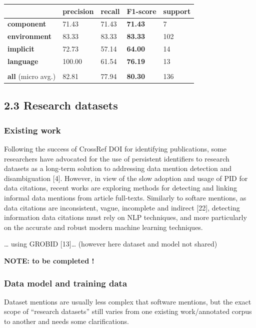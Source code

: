 \documentclass[
]{article}
\begin{document}
\begin{longtable}[]{@{}lllll@{}}
\toprule
& precision & recall & \textbf{F1-score} & support\tabularnewline
\midrule
\endhead
\textbf{component} & 71.43 & 71.43 & \textbf{71.43} & 7\tabularnewline
\textbf{environment} & 83.33 & 83.33 & \textbf{83.33} &
102\tabularnewline
\textbf{implicit} & 72.73 & 57.14 & \textbf{64.00} & 14\tabularnewline
\textbf{language} & 100.00 & 61.54 & \textbf{76.19} & 13\tabularnewline
& & & &\tabularnewline
\textbf{all} (micro avg.) & 82.81 & 77.94 & \textbf{80.30} &
136\tabularnewline
\bottomrule
\end{longtable}

\hypertarget{research-datasets}{%
\subsection{2.3 Research datasets}\label{research-datasets}}

\hypertarget{existing-work}{%
\subsubsection{Existing work}\label{existing-work}}

Following the success of CrossRef DOI for identifying publications, some
researchers have advocated for the use of persistent identifiers to
research datasets as a long-term solution to addressing data mention
detection and disambiguation {[}4{]}. However, in view of the slow
adoption and usage of PID for data citations, recent works are exploring
methods for detecting and linking informal data mentions from article
full-texts. Similarly to softare mentions, as data citations are
inconsistent, vague, incomplete and indirect {[}22{]}, detecting
information data citations must rely on NLP techniques, and more
particularly on the accurate and robust modern machine learning
techniques.

\ldots{} using GROBID {[}13{]}\ldots{} (however here dataset and model
not shared)

\textbf{NOTE: to be completed !}

\hypertarget{data-model-and-training-data-1}{%
\subsubsection{Data model and training
data}\label{data-model-and-training-data-1}}

Dataset mentions are usually less complex that software mentions, but
the exact scope of ``research datasets'' still varies from one existing
work/annotated corpus to another and needs some clarifications.
\end{document}
